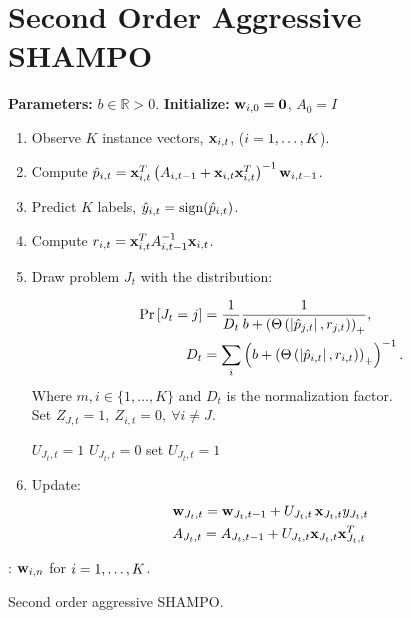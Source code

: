 \section{Second Order Aggressive SHAMPO}


\begin{algorithm}[!h]
\begin{algorithmic}
   \State \textbf{Parameters:}  $b\in\mathbb{R}>0$.
   \State \textbf{Initialize:} $\mathbf{w}_{i,0}={\boldsymbol{0}}$, $A_0=I$ \\
     \begin{enumerate}
     \nolineskips
     \item Observe $K$ instance vectors, $\mathbf{x}_{i,t}$, ($i=1 , \ldots , K$).
     \item Compute  $\hat{p}_{i,t}=\mathbf{x}_{i,t}^T \left({A_{i,t-1}+\mathbf{x}_{i,t}\mathbf{x}_{i,t}^T}\right)^{-1}\mathbf{w}_{i,t-1}$.
     \item Predict $K$ labels, $\hat{y}_{i,t}={\rm sign}(\hat{p}_{i,t})$.
      \item Compute $r_{i,t} = \mathbf{x}_{i,t}^T A_{i,t-1}^{-1}\mathbf{x}_{i,t}$.
     \item Draw problem $J_t$  with the distribution:
     
      \begin{align}
     {\rm Pr}\left[{J_t=j}\right] &= \frac{1}{D_{t}}\frac{1}{b+\left({\Theta\left({\left\vert{\hat{p}_{j,t}}\right\vert,r_{j,t}}\right)}\right)_+}, \nonumber\\
     D_t &= \sum_i \left({b+\left({\Theta\left({\left\vert{\hat{p}_{i,t}}\right\vert,r_{i,t}}\right)}\right)_+}\right)^{-1}. \nonumber
     \end{align}
     Where $m,i\in\{1,\ldots,K\}$ and $D_t$ is the normalization factor. \\
     Set $Z_{J,t}=1,~Z_{i,t}=0 , ~\forall i\ne J $.

     
            \State $U_{J_t,t}=1$
         \Else
            \State $U_{J_t,t}=0$
        \EndIf
    \Else 
        \State set $U_{J_t,t}=1$
    \EndIf
     
     \item Update:
     \begin{align}
     &\mathbf{w}_{J_t,t} = \mathbf{w}_{J_t,t-1}+U_{J_t,t}\,  \mathbf{x}_{J_t,t}  y_{J_t,t}\,\label{perc_update}\\
     &A_{J_t,t}=A_{J_t,t-1}+ U_{J_t,t}\mathbf{x}_{J_t,t}\mathbf{x}_{J_t,t}^T\nonumber
     \end{align}

     
     \end{enumerate}
   \EndFor  
   : $\mathbf{w}_{i,n}$ for $i=1 , \ldots , K$.
\end{algorithmic}
\caption{Second order aggressive SHAMPO.}\label{alg:SHAMPO}
\end{algorithm}

